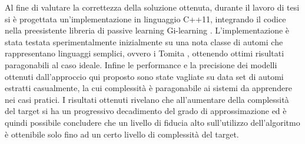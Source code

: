 Al fine di valutare la correttezza della soluzione ottenuta, durante il lavoro di tesi si è progettata un'implementazione in linguaggio C++11, integrando il codice nella preesistente libreria di passive learning Gi-learning \cite{Cot16}. L'implementazione è stata testata sperimentalmente inizialmente su una nota classe di automi che rappresentano linguaggi semplici, ovvero i Tomita \cite{Tomita82, Dupont94}, ottenendo ottimi risultati paragonabili al caso ideale.
Infine le performance e la precisione dei modelli ottenuti dall'approccio qui proposto sono state vagliate su data set di automi estratti casualmente, la cui complessità è paragonabile ai sistemi da apprendere nei casi pratici. I risultati ottenuti rivelano che all'aumentare della complessità del target si ha un progressivo decadimento del grado di approssimazione ed è quindi possibile concludere che un livello di fiducia alto sull'utilizzo dell'algoritmo è ottenibile solo fino ad un certo livello di complessità del target.


